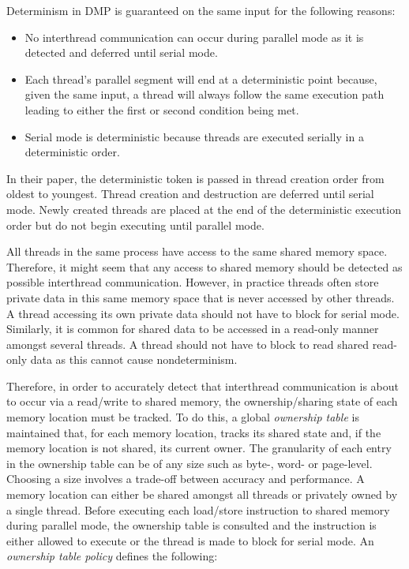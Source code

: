 Determinism in DMP is guaranteed on the same input for the following
reasons:

\begin{itemize}
\item No interthread communication can occur during parallel mode as
  it is detected and deferred until serial mode.

\item Each thread's parallel segment will end at a deterministic point
  because, given the same input, a thread will always follow the same
  execution path leading to either the first or second condition being
  met.

\item Serial mode is deterministic because threads are executed
  serially in a deterministic order.
\end{itemize}

In their paper, the deterministic token is passed in thread creation
order from oldest to youngest.  Thread creation and destruction are
deferred until serial mode.  Newly created threads are placed at the
end of the deterministic execution order but do not begin executing
until parallel mode.

All threads in the same process have access to the same shared memory
space.  Therefore, it might seem that any access to shared memory
should be detected as possible interthread communication.  However, in
practice threads often store private data in this same memory space
that is never accessed by other threads.  A thread accessing its own
private data should not have to block for serial mode.  Similarly, it
is common for shared data to be accessed in a read-only manner amongst
several threads.  A thread should not have to block to read shared
read-only data as this cannot cause nondeterminism.

Therefore, in order to accurately detect that interthread
communication is about to occur via a read/write to shared memory, the
ownership/sharing state of each memory location must be tracked.  To
do this, a global \emph{ownership table} is maintained that, for each
memory location, tracks its shared state and, if the memory location
is not shared, its current owner.  The granularity of each entry in
the ownership table can be of any size such as byte-, word- or
page-level.  Choosing a size involves a trade-off between accuracy and
performance.  A memory location can either be shared amongst all
threads or privately owned by a single thread.  Before executing each
load/store instruction to shared memory during parallel mode, the
ownership table is consulted and the instruction is either allowed to
execute or the thread is made to block for serial mode.  An
\emph{ownership table policy} defines the following:


